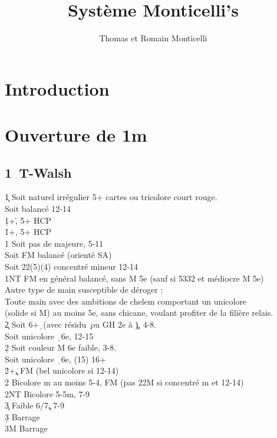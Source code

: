 \documentclass[a4paper]{article}
\title{Système Monticelli's}
\author{Thomas et Romain Monticelli}
\begin{document}
\maketitle
\tableofcontents

\section{Introduction}

\section{Ouverture de 1m}

\subsection{1\pdfc\ T-Walsh}

\begin{bidtable}
1\c \> Soit naturel irrégulier 5+ cartes ou tricolore court rouge.\+\\
Soit \> balancé 12-14\\
1\d {}+\h , 5+ HCP\\
1\h {}+\s , 5+ HCP\\
1\s \> Soit pas de majeure, 5-11\\
\>Soit FM balancé (orienté SA)\\
\>Soit 22(5)(4) concentré mineur 12-14\\
1NT \> FM en général balancé, sans M 5e (sauf si 5332 et médiocre M 5e)\\
\>Autre type de main susceptible de déroger : \\
\>Toute main avec des ambitions de chelem comportant un unicolore \\
\>(solide si M) au moins 5e, sans chicane, voulant profiter de la filière relais.\\
2\c \> Soit 6+\d\ (avec résidu \c\ ou GH 2e à \c ), 4-8.\\
\>Soit unicolore \d\ 6e, 12-15\\
2\d \> Soit couleur M 6e faible, 3-8.\\
\>Soit unicolore \d\ 6e, (15) 16+\\
2\h {}+\c , FM (bel unicolore si 12-14)\\
2\s \> Bicolore m au moins 5-4, FM (pas 22M si concentré m et 12-14)\\
2NT \> Bicolore 5-5m, 7-9\\
3\c \> Faible 6/7\c , 7-9\\
3\d \> Barrage\\
3M \> Barrage\-
\end{bidtable}
\end{document}
